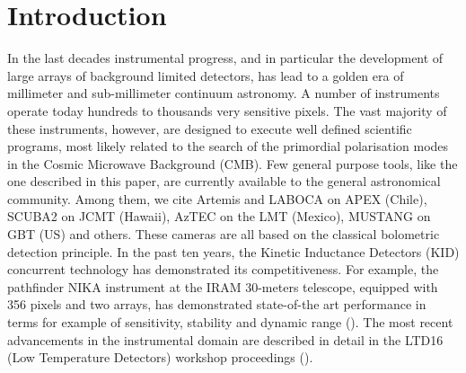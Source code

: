 \documentclass[]{aa} %
\begin{document}
   {}



   \maketitle
%

\section{Introduction}

In the last decades instrumental progress, and in particular the development of large arrays of background limited detectors, has lead to a golden era of millimeter and sub-millimeter continuum astronomy. A number of instruments operate today hundreds to thousands very sensitive pixels. The vast majority of these instruments, however, are designed to execute well defined scientific programs, most likely related to the search of the primordial polarisation modes in the Cosmic Microwave Background (CMB). Few general purpose tools, like the one described in this paper, are currently available to the general astronomical community. Among them, we cite Artemis and LABOCA on APEX (Chile), SCUBA2 on JCMT (Hawaii), AzTEC on the LMT (Mexico), MUSTANG on GBT (US) and others. These cameras are all based on the classical bolometric detection principle. In the past ten years, the Kinetic Inductance Detectors (KID) concurrent technology has demonstrated its competitiveness. For example, the pathfinder NIKA instrument at the IRAM 30-meters telescope, equipped with 356 pixels and two arrays, has demonstrated state-of-the art performance in terms for example of sensitivity, stability and dynamic range (\cite{Catalano2014, Monfardini2011, Adam2014}). The most recent advancements in the instrumental domain are described in detail in the LTD16 (Low Temperature Detectors) workshop proceedings (\cite{ltd16:2016}). 

\end{document}
